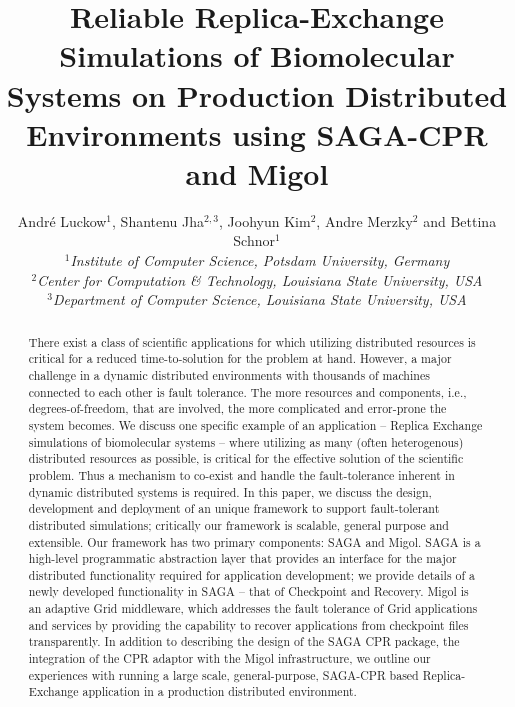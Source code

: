 \documentclass[times, 10pt,twocolumn]{article}
\title{Reliable Replica-Exchange Simulations of Biomolecular Systems
  on Production Distributed Environments using SAGA-CPR and Migol}
\author{
  Andr\'e Luckow$^{1}$, Shantenu Jha$^{2,3}$, Joohyun Kim$^{2}$, Andre Merzky$^{2}$ and Bettina Schnor$^{1}$\\
  \small{\emph{$^{1}$Institute of Computer Science, Potsdam University, Germany}}\\
  \small{\emph{$^{2}$Center for Computation \& Technology, Louisiana State University, USA}}\\
  \small{\emph{$^{3}$Department of Computer Science, Louisiana State University, USA}}\\
}
\begin{document}
 


\maketitle    

\begin{abstract}
  There exist a class of scientific applications for which utilizing
  distributed resources is critical for a reduced time-to-solution for
  the problem at hand. However, a major challenge in a dynamic
  distributed environments with thousands of machines connected to each
  other is fault tolerance. The more resources and components, i.e.,
  degrees-of-freedom, that are involved, the more complicated and
  error-prone the system becomes.  We discuss one specific example of
  an application -- Replica Exchange simulations of biomolecular
  systems -- where utilizing as many (often heterogenous) distributed
  resources as possible, is critical for the effective solution of the
  scientific problem.  Thus a mechanism to co-exist and handle the
  fault-tolerance inherent in dynamic distributed systems is
  required. In this paper, we discuss the design, development and
  deployment of an unique framework to support fault-tolerant
  distributed simulations; critically our framework is scalable,
  general purpose and extensible. Our framework has two primary
  components: SAGA and Migol.  SAGA is a high-level programmatic
  abstraction layer that provides an interface for the major
  distributed functionality required for application development; we
  provide details of a newly developed functionality in SAGA -- that
  of Checkpoint and Recovery. Migol is an adaptive Grid middleware,
  which addresses the fault tolerance of Grid applications and
  services by providing the capability to recover applications from
  checkpoint files transparently.  In addition to describing the
  design of the SAGA CPR package, the integration of the CPR adaptor
  with the Migol infrastructure, we outline our experiences with
  running a large scale, general-purpose, SAGA-CPR based
  Replica-Exchange application in a production distributed
  environment.

    
\end{abstract}
\end{document}
